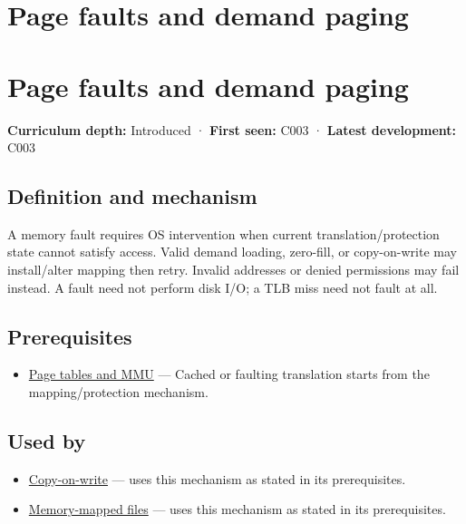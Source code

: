 \hypertarget{appendix-cc0909a7ef14}{}
\section*{Page faults and demand paging}
\section{Page faults and demand paging}\label{appendix-cc0909a7ef14-page-faults-and-demand-paging}

\textbf{Curriculum depth:} Introduced · \textbf{First seen:} C003 · \textbf{Latest development:} C003

\subsection{Definition and mechanism}\label{appendix-cc0909a7ef14-definition-and-mechanism}

A memory fault requires OS intervention when current translation/protection state cannot satisfy access. Valid demand loading, zero-fill, or copy-on-write may install/alter mapping then retry. Invalid addresses or denied permissions may fail instead. A fault need not perform disk I/O; a TLB miss need not fault at all.

\subsection{Prerequisites}\label{appendix-cc0909a7ef14-prerequisites}

\begin{itemize}
\tightlist
\item
  \hyperref[appendix-01e5905165c4]{Page tables and MMU} --- Cached or faulting translation starts from the mapping/protection mechanism.
\end{itemize}

\subsection{Used by}\label{appendix-cc0909a7ef14-used-by}

\begin{itemize}
\tightlist
\item
  \hyperref[appendix-7a06e5baac04]{Copy-on-write} --- uses this mechanism as stated in its prerequisites.
\item
  \hyperref[appendix-313ee7a0ba7b]{Memory-mapped files} --- uses this mechanism as stated in its prerequisites.
\end{itemize}

